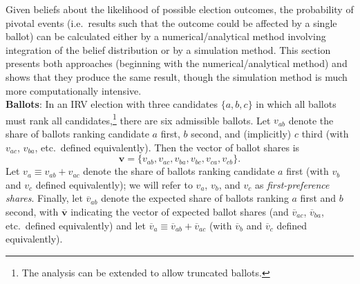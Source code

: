 \documentclass[11pt,a4paper]{article}
\begin{document}

Given beliefs about the likelihood of possible election outcomes, the probability of pivotal events (i.e.\ results such that the outcome could be affected by a single ballot) can be calculated either by a numerical/analytical method involving integration of the belief distribution or by a simulation method. This section presents both approaches (beginning with the numerical/analytical method) and shows that they produce the same result, though the simulation method is much more computationally intensive. \\    

\noindent \textbf{Ballots}: In an IRV election with three candidates $\{a,b,c\}$ in which all ballots must rank all candidates,\footnote{The analysis can be extended to allow truncated ballots.} there are six admissible ballots. Let $v_{ab}$ denote the share of ballots ranking candidate $a$ first, $b$ second, and (implicitly) $c$ third (with $v_{ac}$, $v_{ba}$, etc.\ defined equivalently). Then the vector of ballot shares is 
\[
\mathbf{v} = \{ v_{ab}, v_{ac}, v_{ba}, v_{bc}, v_{ca}, v_{cb} \}. 
\]  
Let $v_a \equiv v_{ab} + v_{ac}$ denote the share of ballots ranking candidate $a$ first (with $v_b$ and $v_c$ defined equivalently); we will refer to $v_a$, $v_b$, and $v_c$ as \emph{first-preference shares}. Finally, let $\overline{v}_{ab}$ denote the expected share of ballots ranking $a$ first and $b$ second, with $\mathbf{\overline{v}}$ indicating the vector of expected ballot shares (and $\overline{v}_{ac}$, $\overline{v}_{ba}$, etc.\ defined equivalently) and let $\overline{v}_{a} \equiv \overline{v}_{ab} + \overline{v}_{ac}$ (with $\overline{v}_b$ and $\overline{v}_c$ defined equivalently). \\
\end{document}
